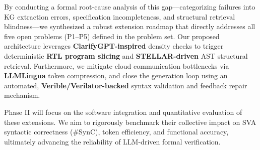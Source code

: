 \documentclass[12pt,a4paper]{article}
\begin{document}
By conducting a formal root-cause analysis of this gap---categorizing failures into KG extraction errors, specification incompleteness, and structural retrieval blindness---we synthesized a robust extension roadmap that directly addresses all five open problems (P1--P5) defined in the problem set. Our proposed architecture leverages \textbf{ClarifyGPT-inspired} density checks to trigger deterministic \textbf{RTL program slicing} and \textbf{STELLAR-driven} AST structural retrieval. Furthermore, we mitigate cloud communication bottlenecks via \textbf{LLMLingua} token compression, and close the generation loop using an automated, \textbf{Verible/Verilator-backed} syntax validation and feedback repair mechanism. 

Phase II will focus on the software integration and quantitative evaluation of these extensions. We aim to rigorously benchmark their collective impact on SVA syntactic correctness (\#SynC), token efficiency, and functional accuracy, ultimately advancing the reliability of LLM-driven formal verification.
\end{document}
